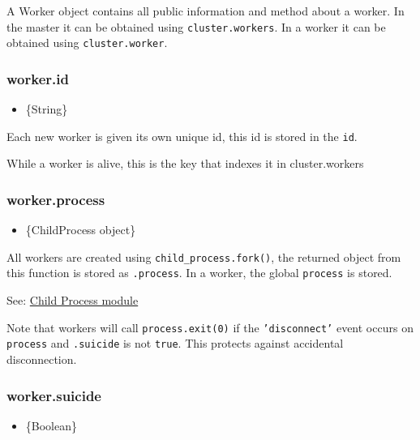 A Worker object contains all public information and method about a
worker. In the master it can be obtained using \texttt{cluster.workers}.
In a worker it can be obtained using \texttt{cluster.worker}.

\subsubsection{worker.id}\label{worker.id}

\begin{itemize}
\itemsep1pt\parskip0pt
\item
  \{String\}
\end{itemize}

Each new worker is given its own unique id, this id is stored in the
\texttt{id}.

While a worker is alive, this is the key that indexes it in
cluster.workers

\subsubsection{worker.process}\label{worker.process}

\begin{itemize}
\itemsep1pt\parskip0pt
\item
  \{ChildProcess object\}
\end{itemize}

All workers are created using \texttt{child\_process.fork()}, the
returned object from this function is stored as \texttt{.process}. In a
worker, the global \texttt{process} is stored.

See:
\href{child_process.html\#child_process_child_process_fork_modulepath_args_options}{Child
Process module}

Note that workers will call \texttt{process.exit(0)} if the
\texttt{'disconnect'} event occurs on \texttt{process} and
\texttt{.suicide} is not \texttt{true}. This protects against accidental
disconnection.

\subsubsection{worker.suicide}\label{worker.suicide}

\begin{itemize}
\itemsep1pt\parskip0pt
\item
  \{Boolean\}
\end{itemize}

